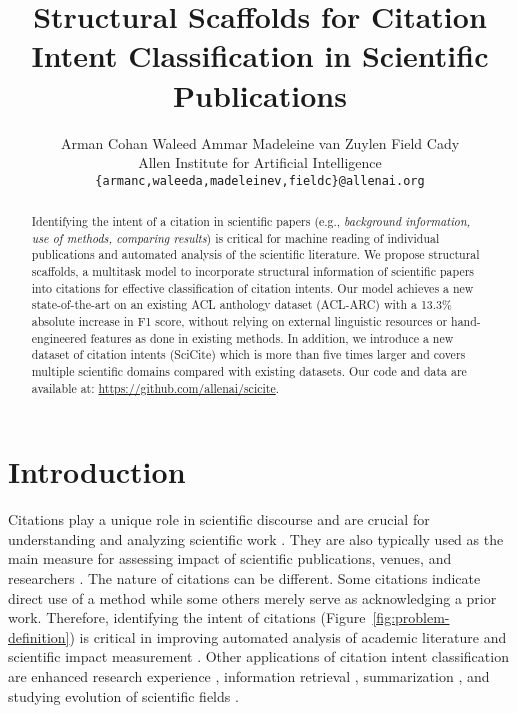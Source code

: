 \documentclass[11pt,a4paper]{article}
\title{Structural Scaffolds for Citation \\Intent  Classification in Scientific Publications}
\author{Arman Cohan \quad\quad Waleed Ammar \quad\quad Madeleine van Zuylen \quad\quad Field Cady \vspace{6pt} \\
  Allen Institute for Artificial Intelligence \\ \vspace{4pt}
  \small{\tt{\{armanc,waleeda,madeleinev,fieldc\}@allenai.org}}
  }
\date{}
\newcommand{\I}[1][\textit]{#1}
\begin{document}
\maketitle
\begin{abstract}
Identifying the intent of a citation in scientific papers (e.g., \I{background information, use of methods, comparing results}) is critical for machine reading of individual publications and automated analysis of the scientific literature.
We propose structural scaffolds, a multitask model to incorporate structural information of scientific papers into citations for effective classification of citation intents.
Our model achieves a new state-of-the-art on an existing ACL anthology dataset (ACL-ARC) with a 13.3\% absolute increase in F1 score, without relying on external linguistic resources or hand-engineered features as done in existing methods.
In addition, we introduce a new dataset of citation intents (SciCite) which is more than five times larger and covers multiple scientific domains compared with existing datasets. Our code and data are available at: \url{https://github.com/allenai/scicite}.








\end{abstract}

\section{Introduction}





Citations play a unique role in scientific discourse and are crucial for understanding and analyzing scientific work \cite{luukkonen1992scientists,leydesdorff1998theories}. They are also typically used as the main measure for assessing impact of scientific publications, venues, and researchers \cite{Li2008}.
The nature of citations can be different. Some citations indicate direct use of a method while some others merely serve as acknowledging a prior work.
Therefore, identifying the intent of citations (Figure~\ref{fig:problem-definition}) is critical in improving automated analysis of academic literature and scientific impact measurement \cite{leydesdorff1998theories,small2018}. Other applications of citation intent classification are enhanced research experience \cite{moravcsik1975some}, information retrieval \cite{ritchie2009citation}, summarization \cite{cohan2015summarization}, and studying evolution of scientific fields \cite{jurgens2018}.
\end{document}
